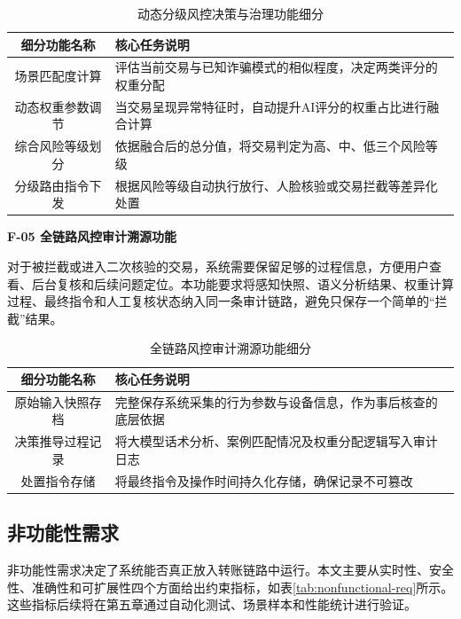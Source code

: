 \documentclass{xduugthesis}
\begin{document}
\begin{table}[H]
    \centering
    \caption{动态分级风控决策与治理功能细分}
    \label{tab:f04-sub}
    \begin{tabular}{|c|p{7cm}|}
        \hline
        细分功能名称 & 核心任务说明 \\
        \hline
        场景匹配度计算 & 评估当前交易与已知诈骗模式的相似程度，决定两类评分的权重分配 \\
        \hline
        动态权重参数调节 & 当交易呈现异常特征时，自动提升AI评分的权重占比进行融合计算 \\
        \hline
        综合风险等级划分 & 依据融合后的总分值，将交易判定为高、中、低三个风险等级 \\
        \hline
        分级路由指令下发 & 根据风险等级自动执行放行、人脸核验或交易拦截等差异化处置 \\
        \hline
    \end{tabular}
\end{table}

\textbf{F-05 全链路风控审计溯源功能}

对于被拦截或进入二次核验的交易，系统需要保留足够的过程信息，方便用户查看、后台复核和后续问题定位。本功能要求将感知快照、语义分析结果、权重计算过程、最终指令和人工复核状态纳入同一条审计链路，避免只保存一个简单的“拦截”结果。

\begin{table}[H]
    \centering
    \caption{全链路风控审计溯源功能细分}
    \label{tab:f05-sub}
    \begin{tabular}{|c|p{7cm}|}
        \hline
        细分功能名称 & 核心任务说明 \\
        \hline
        原始输入快照存档 & 完整保存系统采集的行为参数与设备信息，作为事后核查的底层依据 \\
        \hline
        决策推导过程记录 & 将大模型话术分析、案例匹配情况及权重分配逻辑写入审计日志 \\
        \hline
        处置指令存储 & 将最终指令及操作时间持久化存储，确保记录不可篡改 \\
        \hline
    \end{tabular}
\end{table}

\subsection{非功能性需求}

非功能性需求决定了系统能否真正放入转账链路中运行。本文主要从实时性、安全性、准确性和可扩展性四个方面给出约束指标，如表\ref{tab:nonfunctional-req}所示。这些指标后续将在第五章通过自动化测试、场景样本和性能统计进行验证。
\end{document}
